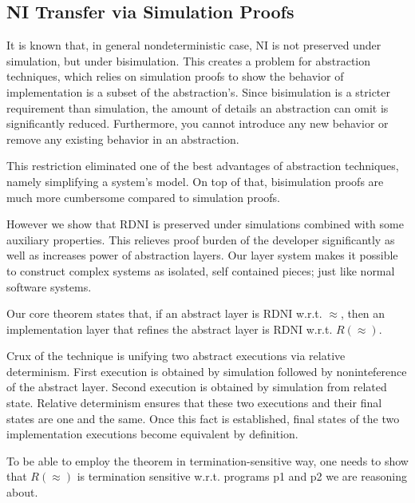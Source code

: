 \subsection{NI Transfer via Simulation Proofs}
It is known that, in general nondeterministic case, NI is not preserved under simulation, but under bisimulation. This creates a problem for abstraction techniques, which relies on simulation proofs to show the behavior of implementation is a subset of the abstraction's. Since bisimulation is a stricter requirement than simulation, the amount of details an abstraction can omit is significantly reduced. Furthermore, you cannot introduce any new behavior or remove any existing behavior in an abstraction.

This restriction eliminated one of the best advantages of abstraction techniques, namely simplifying a system's model.
On top of that, bisimulation proofs are much more cumbersome compared to simulation proofs. 

However we show that RDNI is preserved under simulations combined with some auxiliary properties. This relieves proof burden of the developer significantly as well as increases power of abstraction layers. Our layer system makes it possible to construct complex systems as isolated, self contained pieces; just like normal software systems.

Our core theorem states that, if an abstract layer is RDNI w.r.t. $\approx$, then an implementation layer that refines the abstract layer is RDNI w.r.t. $R(\approx)$.  

Crux of the technique is unifying two abstract executions via relative determinism. First execution is obtained by simulation followed by noninteference of the abstract layer. Second execution is obtained by simulation from related state. Relative determinism ensures that these two executions and their final states are one and the same. Once this fact is established, final states of the two implementation executions become equivalent by definition.

To be able to employ the theorem in termination-sensitive way, one needs to show that $R(\approx)$ is termination sensitive w.r.t. programs p1 and p2 we are reasoning about.

%